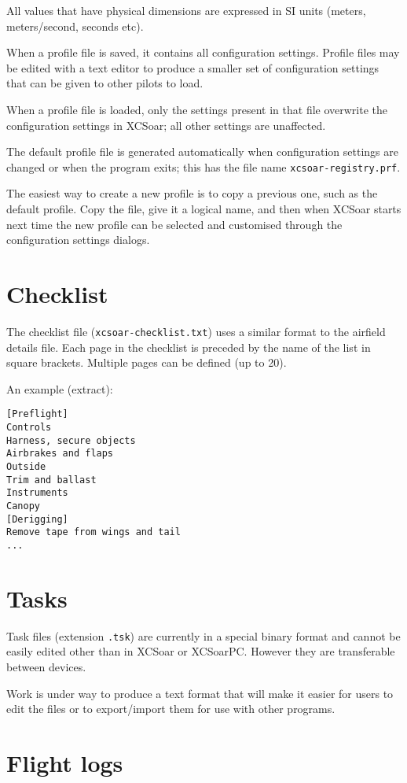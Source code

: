 All values that have physical dimensions are expressed in SI units
(meters, meters/second, seconds etc).

When a profile file is saved, it contains all configuration settings.
Profile files may be edited with a text editor to produce a smaller
set of configuration settings that can be given to other pilots to
load.  

When a profile file is loaded, only the settings present in that file
overwrite the configuration settings in XCSoar; all other settings are
unaffected.

The default profile file is generated automatically when configuration
settings are changed or when the program exits; this has the
file name \verb|xcsoar-registry.prf|.

The easiest way to create a new profile is to copy a previous one,
such as the default profile.  Copy the file, give it a logical name,
and then when XCSoar starts next time the new profile can be selected
and customised through the configuration settings dialogs.


\section{Checklist}

The checklist file (\verb|xcsoar-checklist.txt|) uses a similar format to
the airfield details file.  Each page in the checklist is preceded by
the name of the list in square brackets.  Multiple pages can be
defined (up to 20).

An example (extract):
\begin{verbatim}
[Preflight]
Controls
Harness, secure objects
Airbrakes and flaps
Outside
Trim and ballast
Instruments
Canopy
[Derigging]
Remove tape from wings and tail
...
\end{verbatim}

\section{Tasks}
Task files (extension \verb|.tsk|) are currently in a special binary
format and cannot be easily edited other than in XCSoar or XCSoarPC.
However they are transferable between devices.

Work is under way to produce a text format that will make it easier
for users to edit the files or to export/import them for use with other
programs.

\section{Flight logs}

